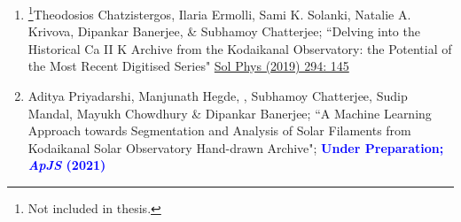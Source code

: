 \begin{enumerate}
    \item \footnote{Not included in thesis.}Theodosios Chatzistergos, Ilaria Ermolli, Sami K. Solanki, Natalie A. Krivova, Dipankar Banerjee,  \& Subhamoy Chatterjee; ``Delving into the Historical Ca II K Archive from the Kodaikanal Observatory: the Potential of the Most Recent Digitised Series"  \href{https://doi.org/10.1007/s11207-019-1532-5}{ Sol Phys (2019) 294: 145}
    

    \item \footnotemark[\value{footnote}]Aditya Priyadarshi, Manjunath Hegde, , Subhamoy Chatterjee, Sudip Mandal, Mayukh Chowdhury \& Dipankar Banerjee; ``A Machine Learning Approach towards Segmentation and Analysis of Solar Filaments from Kodaikanal Solar Observatory Hand-drawn Archive"; \textcolor{blue}{\bf Under Preparation; {\it ApJS} (2021)}
    
\end{enumerate}

\clearpage 
\pagestyle{empty}

